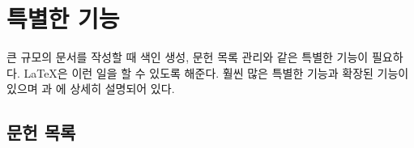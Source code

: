 
\chapter{특별한 기능}

\begin{intro}
큰 규모의 문서를 작성할 때 색인 생성, 문헌 목록 관리와 같은
특별한 기능이 필요하다. \LaTeX 은 이런 일을 할 수 있도록 해준다.
훨씬 많은 특별한 기능과 확장된 기능이 있으며 {\normalfont\manual}과 {\normalfont\companion}에
상세히 설명되어 있다.
\end{intro}

\section{문헌 목록}
\nobibintoc

